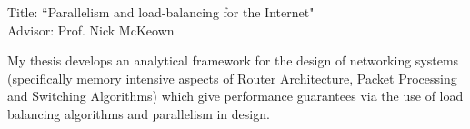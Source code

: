 \documentclass[10pt,a4]{article}
\begin{document}
\begin{small}
\begin{list}{}{}
\item Title: ``Parallelism and load-balancing for the Internet"  \\
Advisor: Prof. Nick McKeown
\end{list}

My thesis develops an analytical framework for the design of networking systems
(specifically memory intensive aspects of Router Architecture, Packet Processing and Switching Algorithms) which give performance guarantees via the use of load balancing algorithms and parallelism in design. 













\end{small}
\end{document}
